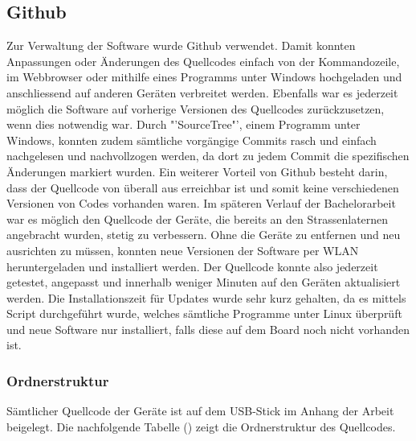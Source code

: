 \subsection{Github}
Zur Verwaltung der Software wurde Github verwendet. Damit konnten Anpassungen oder Änderungen des Quellcodes einfach von der Kommandozeile, im Webbrowser oder mithilfe eines Programms unter Windows hochgeladen und anschliessend auf anderen Geräten verbreitet werden. Ebenfalls war es jederzeit möglich die Software auf vorherige Versionen des Quellcodes zurückzusetzen, wenn dies notwendig war. Durch "'SourceTree"', einem Programm unter Windows, konnten zudem sämtliche vorgängige Commits rasch und einfach nachgelesen und nachvollzogen werden, da dort zu jedem Commit die spezifischen Änderungen markiert wurden. Ein weiterer Vorteil von Github besteht darin, dass der Quellcode von überall aus erreichbar ist und somit keine verschiedenen Versionen von Codes vorhanden waren. 
Im späteren Verlauf der Bachelorarbeit war es möglich den Quellcode der Geräte, die bereits an den Strassenlaternen angebracht wurden, stetig zu verbessern. Ohne die Geräte zu entfernen und neu ausrichten zu müssen, konnten neue Versionen der Software per WLAN heruntergeladen und installiert werden. Der Quellcode konnte also jederzeit getestet, angepasst und innerhalb weniger Minuten auf den Geräten aktualisiert werden. Die Installationszeit für Updates wurde sehr kurz gehalten, da es mittels Script durchgeführt wurde, welches sämtliche Programme unter Linux überprüft und neue Software nur installiert, falls diese auf dem Board noch nicht vorhanden ist.

\subsubsection{Ordnerstruktur}
Sämtlicher Quellcode der Geräte ist auf dem USB-Stick im Anhang der Arbeit beigelegt. Die nachfolgende Tabelle () zeigt die Ordnerstruktur des Quellcodes.


